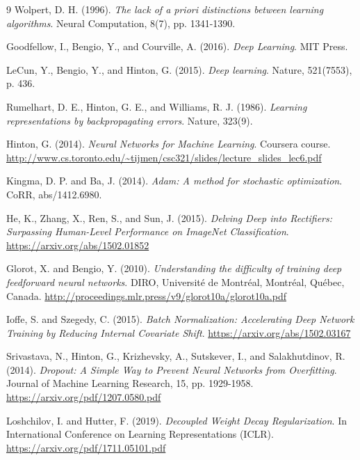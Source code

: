 \begin{thebibliography}{9}
Wolpert, D. H. (1996).
\textit{The lack of a priori distinctions between learning algorithms}.
Neural Computation, 8(7), pp. 1341-1390.

Goodfellow, I., Bengio, Y., and Courville, A. (2016).
\textit{Deep Learning}.
MIT Press.

LeCun, Y., Bengio, Y., and Hinton, G. (2015).
\textit{Deep learning}.
Nature, 521(7553), p. 436.

Rumelhart, D. E., Hinton, G. E., and Williams, R. J. (1986).
\textit{Learning representations by backpropagating errors}.
Nature, 323(9).

Hinton, G. (2014).
\textit{Neural Networks for Machine Learning}.
Coursera course.
\url{http://www.cs.toronto.edu/~tijmen/csc321/slides/lecture_slides_lec6.pdf}

Kingma, D. P. and Ba, J. (2014).
\textit{Adam: A method for stochastic optimization}.
CoRR, abs/1412.6980.

He, K., Zhang, X., Ren, S., and Sun, J. (2015).
\textit{Delving Deep into Rectifiers: Surpassing Human-Level Performance on ImageNet Classification}.
\url{https://arxiv.org/abs/1502.01852}

Glorot, X. and Bengio, Y. (2010).
\textit{Understanding the difficulty of training deep feedforward neural networks}.
DIRO, Université de Montréal, Montréal, Québec, Canada.
\url{http://proceedings.mlr.press/v9/glorot10a/glorot10a.pdf}

Ioffe, S. and Szegedy, C. (2015).
\textit{Batch Normalization: Accelerating Deep Network Training by Reducing Internal Covariate Shift}.
\url{https://arxiv.org/abs/1502.03167}

Srivastava, N., Hinton, G., Krizhevsky, A., Sutskever, I., and Salakhutdinov, R. (2014).
\textit{Dropout: A Simple Way to Prevent Neural Networks from Overfitting}.
Journal of Machine Learning Research, 15, pp. 1929-1958.
\url{https://arxiv.org/pdf/1207.0580.pdf}
 
Loshchilov, I. and Hutter, F. (2019).
\textit{Decoupled Weight Decay Regularization}.
In International Conference on Learning Representations (ICLR).
\url{https://arxiv.org/pdf/1711.05101.pdf}


\end{thebibliography}
